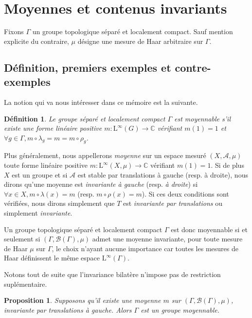 \documentclass[a4paper,12pt]{article}
\newtheorem{proposition}[theorem]{Proposition}
\newtheorem{definition}[theorem]{Définition}
\newcommand{\C}{\mathbb{C}}
\newcommand{\Bor}{\mathcal{B}}
\newcommand{\ssi}{si et seulement si }
\newcommand{\comp}{\circ}
\newcommand{\TODO}[1]{}%
\begin{document}

\section{Moyennes et contenus invariants}

Fixons $\Gamma$ un groupe topologique séparé et localement compact. Sauf mention explicite du contraire, $\mu$ désigne une mesure de Haar arbitraire
sur $\Gamma$.

\subsection{Définition, premiers exemples et contre-exemples}

La notion qui va nous intéresser dans ce mémoire est la suivante.

\begin{definition}\label{amenable_def}
    Le groupe séparé et localement compact $\Gamma$ est \emph{moyennable} s'il existe une forme linéaire positive $m : \mathrm{L}^\infty(G)\to\C$
    vérifiant $m(1) = 1$ et $\forall g\in\Gamma, m\comp\lambda_g = m = m\comp\rho_g$.
\end{definition}

Plus généralement, nous appellerons \emph{moyenne} sur un espace mesuré $(X,\mathcal{A},\mu)$ toute forme 
linéaire positive $m : \mathrm{L}^\infty(X, \mu)\to\C$ vérifiant $m(1) = 1$. Si de plus $X$ est un groupe 
et si $\mathcal{A}$ est stable par translations à gauche (resp. à droite), nous dirons qu'une moyenne est \emph{invariante à gauche}
(resp. \emph{à droite}) si $\forall x\in X, m\comp\lambda(x) = m$ (resp. $m\comp\rho(x) = m$). Si ces deux conditions 
sont vérifiées, nous dirons simplement que $T$ est \emph{invariante par translations} ou simplement \emph{invariante}.

Un groupe topologique séparé et localement compact $\Gamma$ est donc moyennable \ssi $(\Gamma, \Bor(\Gamma), \mu)$ admet une 
moyenne invariante, pour toute mesure de Haar $\mu$ sur $\Gamma$, le choix n'ayant aucune importance car toutes les mesures 
de Haar définissent le même espace $\mathrm{L}^\infty(\Gamma)$.

Notons tout de suite que l'invariance bilatère n'impose pas de restriction suplémentaire. 
\begin{proposition}\label{bilateral_of_left}
    Supposons qu'il existe une moyenne $m$ sur $(\Gamma, \Bor(\Gamma), \mu)$, invariante par translations \emph{à gauche}.
    Alors $\Gamma$ est un groupe moyennable.
\end{proposition} 
\end{document}
